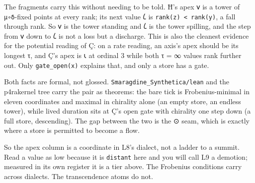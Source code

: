 \begin{enumerate}
  The fragments carry this without needing to be told. Ħ's apex 𐑫 is a
  tower of \texttt{μ∘δ}-fixed points at every rank; its next value 𐑖 is
  \texttt{rank(z)\ \textless{}\ rank(y)}, a fall through rank. So 𐑫 is
  the tower standing and 𐑖 is the tower spilling, and the step from 𐑫
  down to 𐑖 is not a loss but a discharge. This is also the cleanest
  evidence for the potential reading of Ç: on a rate reading, an axis's
  apex should be its longest τ, and Ç's apex is 𐑧 at ordinal 3 while
  both τ = ∞ values rank further out. Only \texttt{gate\_open(x)}
  explains that, and only a store has a gate.

  Both facts are formal, not glossed.
  \texttt{Smaragdine\_Synthetica/lean} and the p4rakernel tree carry the
  pair as theorems: the bare tick is Frobenius-minimal in eleven
  coordinates and maximal in chirality alone (an empty store, an endless
  tower), while lived duration sits at Ç's open gate with chirality one
  step down (a full store, descending). The gap between the two is the ⊙
  seam, which is exactly where a store is permitted to become a flow.

  So the apex column is a coordinate in L8's dialect, not a ladder to a
  summit. Read a value as low because it is \texttt{distant} here and
  you will call L9 a demotion; measured in its own register it is a tier
  above. The Frobenius conditions carry across dialects. The
  transcendence atoms do not.
\end{enumerate}
